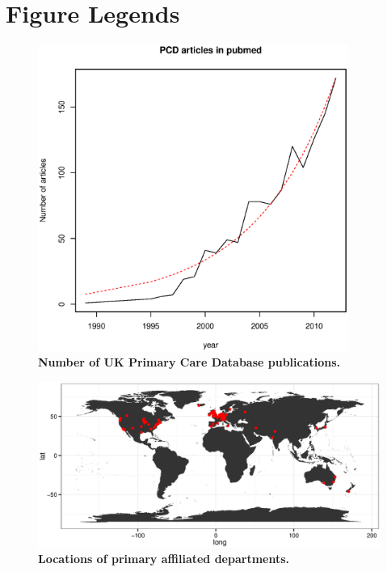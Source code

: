 \documentclass[10pt]{article}
\begin{document}
\section*{Figure Legends}

\begin{figure}[!ht]
\begin{center}
\includegraphics[width=4in]{figure/articles_per_year.eps}
\end{center}
\caption{
    {\bf Number of UK Primary Care Database publications.}
}
\label{figure1_articles_per_year}
\end{figure}

\begin{figure}[!ht]
\begin{center}
  \includegraphics[width=6in]{figure/PCD_world.eps}
\end{center}
\caption{
    {\bf Locations of primary affiliated departments.}
}
\label{figure2_PCD_map}
\end{figure}
\end{document}
